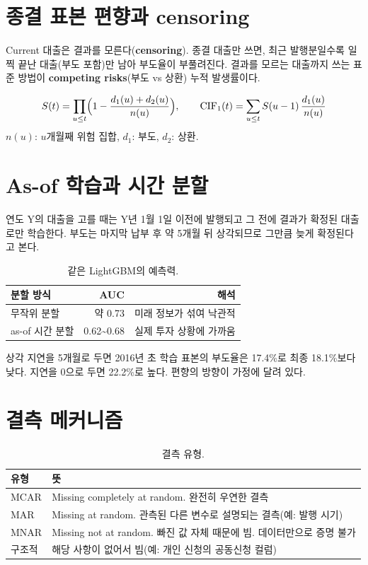 \section{종결 표본 편향과 censoring}
Current 대출은 결과를 모른다(\textbf{censoring}). 종결 대출만 쓰면, 최근 발행분일수록 일찍 끝난 대출(부도 포함)만 남아 부도율이 부풀려진다. 결과를 모르는 대출까지 쓰는 표준 방법이 \textbf{competing risks}(부도 vs 상환) 누적 발생률이다.

\begin{formulabox}
\[ S(t)=\prod_{u\le t}\Bigl(1-\frac{d_1(u)+d_2(u)}{n(u)}\Bigr),\qquad
\mathrm{CIF}_1(t)=\sum_{u\le t} S(u-1)\,\frac{d_1(u)}{n(u)} \]
$n(u)$: $u$개월째 위험 집합, $d_1$: 부도, $d_2$: 상환.
\end{formulabox}

\section{As-of 학습과 시간 분할}
연도 Y의 대출을 고를 때는 Y년 1월 1일 이전에 발행되고 그 전에 결과가 확정된 대출로만 학습한다. 부도는 마지막 납부 후 약 5개월 뒤 상각되므로 그만큼 늦게 확정된다고 본다.

\begin{table}[H]\centering\small
\begin{tabular}{@{}lrr@{}}\toprule
분할 방식 & AUC & 해석\\\midrule
무작위 분할 & 약 0.73 & 미래 정보가 섞여 낙관적\\
as-of 시간 분할 & 0.62\textasciitilde 0.68 & 실제 투자 상황에 가까움\\\bottomrule
\end{tabular}
\caption{같은 LightGBM의 예측력.}
\end{table}

\begin{warnbox}
상각 지연을 5개월로 두면 2016년 초 학습 표본의 부도율은 17.4\%로 최종 18.1\%보다 낮다. 지연을 0으로 두면 22.2\%로 높다. 편향의 방향이 가정에 달려 있다.
\end{warnbox}

\section{결측 메커니즘}
\begin{table}[H]\centering\small
\begin{tabularx}{\linewidth}{@{}lL@{}}\toprule
유형 & 뜻\\\midrule
MCAR & Missing completely at random. 완전히 우연한 결측\\
MAR & Missing at random. 관측된 다른 변수로 설명되는 결측(예: 발행 시기)\\
MNAR & Missing not at random. 빠진 값 자체 때문에 빔. 데이터만으로 증명 불가\\
구조적 & 해당 사항이 없어서 빔(예: 개인 신청의 공동신청 컬럼)\\\bottomrule
\end{tabularx}
\caption{결측 유형.}
\end{table}

